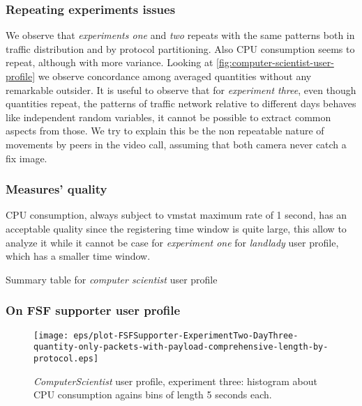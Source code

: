 \documentclass[10pt,a4paper]{article}
\begin{document}
    \subsubsection*{Repeating experiments issues}
    
    We observe that \emph{experiments one} and \emph{two} repeats with
    the same patterns both in traffic distribution and by protocol
    partitioning. Also CPU consumption seems to repeat, although with
    more variance. Looking at
    \autoref{fig:computer-scientist-user-profile} we observe
    concordance among averaged quantities without any remarkable
    outsider. It is useful to observe that for \emph{experiment
      three}, even though quantities repeat, the patterns of traffic
    network relative to different days behaves like independent random
    variables, it cannot be possible to extract common aspects from
    those. We try to explain this be the non repeatable nature of
    movements by peers in the video call, assuming that both camera
    never catch a fix image.


    \subsubsection*{Measures' quality}
    CPU consumption, always subject to vmstat maximum rate of 1
    second, has an acceptable quality since the registering time
    window is quite large, this allow to analyze it while it cannot be
    case for \emph{experiment one} for \emph{landlady} user profile,
    which has a smaller time window.

    \begin{table}
      \begin{adjustwidth}{-2cm}{}
            
      \end{adjustwidth}
      \caption{Summary table for \emph{computer scientist} user profile}
      \label{fig:computer-scientist-user-profile}
    \end{table}

    \newpage

    \subsubsection{On FSF supporter user profile}

    \begin{figure}
      \centering
      \texttt{[image: eps/plot-FSFSupporter-ExperimentTwo-DayThree-quantity-only-packets-with-payload-comprehensive-length-by-protocol.eps]}
      \caption{\emph{ComputerScientist} user profile, experiment
        three: histogram about CPU consumption agains bins of length 5
        seconds each.}
      \label{fig:fsf-supporter-ubuntu-scatter}
    \end{figure}
\end{document}
